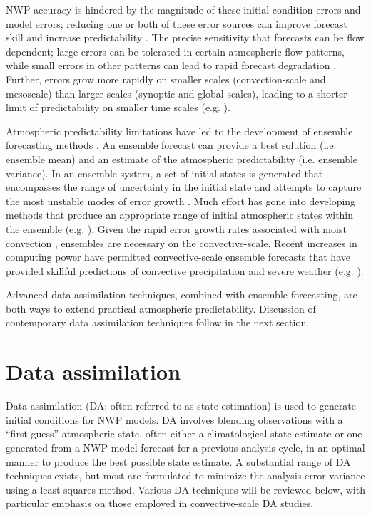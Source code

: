 NWP accuracy is hindered by the magnitude of these initial condition errors and model errors; reducing one or both of these error sources can improve forecast skill and increase predictability \citep{lorenz65}. The precise sensitivity that forecasts can be flow dependent; large errors can be tolerated in certain atmospheric flow patterns, while small errors in other patterns can lead to rapid forecast degradation \citep{lorenz65,zhangetal06b}. Further, errors grow more rapidly on smaller scales (convection-scale and mesoscale) than larger scales (synoptic and global scales), leading to a shorter limit of predictability on smaller time scales (e.g. \citealt{zhangetal03}).

Atmospheric predictability limitations have led to the development of ensemble forecasting methods \citep{leith74,tractonkalnay93}. An ensemble forecast can provide a best solution (i.e. ensemble mean) and an estimate of the atmospheric predictability (i.e. ensemble variance). In an ensemble system, a set of initial states is generated that encompasses the range of uncertainty in the initial state and attempts to capture the most unstable modes of error growth \citep{tothkalnay93}. Much effort has gone into developing methods that produce an appropriate range of initial atmospheric states within the ensemble (e.g. \citealt{leith74,hoffmankalnay83,tothkalnay93,palmeretal92}). Given the rapid error growth rates associated with moist convection \citep{zhangetal06b}, ensembles are necessary on the convective-scale. Recent increases in computing power have permitted convective-scale ensemble forecasts that have provided skillful predictions of convective precipitation and severe weather (e.g. \citealt{kongetal06,clarketal09,clarketal10}).

Advanced data assimilation techniques, combined with ensemble forecasting, are both ways to extend practical atmospheric predictability. Discussion of contemporary data assimilation techniques follow in the next section.

\pagebreak
\section{Data assimilation}
Data assimilation (DA; often referred to as state estimation) is used to generate initial conditions for NWP models. DA involves blending observations with a “first-guess” atmospheric state, often either a climatological state estimate or one generated from a NWP model forecast for a previous analysis cycle, in an optimal manner to produce the best possible state estimate. A substantial range of DA techniques exists, but most are formulated to minimize the analysis error variance using a least-squares method. Various DA techniques will be reviewed below, with particular emphasis on those employed in convective-scale DA studies.

